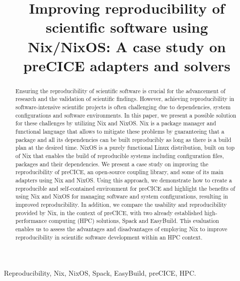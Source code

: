 \documentclass[conference,final,a4paper]{IEEEtran}
\begin{document}
\title{Improving reproducibility of scientific software using Nix/NixOS: A case study on preCICE adapters and solvers}

\author{
\and
{}
}

\maketitle

\begin{abstract}
  Ensuring the reproducibility of scientific software is crucial for the advancement of research and the validation of scientific findings.
  However, achieving reproducibility in software-intensive scientific projects is often challenging due to dependencies, system configurations and software environments.
  In this paper, we present a possible solution for these challenges by utilizing Nix and NixOS.
  Nix is a package manager and functional language that allows to mitigate these problems by guaranteeing that a package and all its dependencies can be built reproducibly as long as there is a build plan at the desired time.
  NixOS is a purely functional Linux distribution, built on top of Nix that enables the build of reproducible systems including configuration files, packages and their dependencies.
  We present a case study on improving the reproducibility of preCICE, an open-source coupling library, and some of its main adapters using Nix and NixOS.
  Using this approach, we demonstrate how to create a reproducible and self-contained environment for preCICE and highlight the benefits of using Nix and NixOS for managing software and system configurations, resulting in improved reproducibility.
  In addition, we compare the usability and reproducibility provided by Nix, in the context of preCICE, with two already established high-performance computing (HPC) solutions, Spack and EasyBuild.
  This evaluation enables us to assess the advantages and disadvantages of employing Nix to improve reproducibility in scientific software development within an HPC context.
\end{abstract}

\begin{IEEEkeywords}
  Reproducibility, Nix, NixOS, Spack, EasyBuild, preCICE, HPC.
\end{IEEEkeywords}
\end{document}
